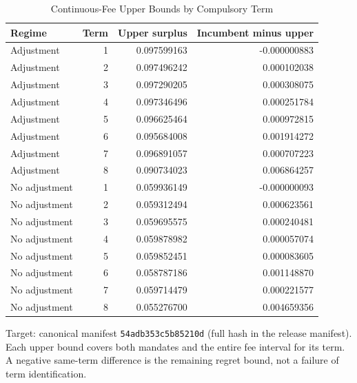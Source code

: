 \begin{table}[t]
\caption{Continuous-Fee Upper Bounds by Compulsory Term}\label{tab:termbounds}
\centering
\footnotesize
\begin{tabular}{@{}lrrr@{}}
\toprule
Regime & Term & Upper surplus & Incumbent minus upper \\
\midrule
Adjustment & 1 & 0.097599163 & -0.000000883 \\
Adjustment & 2 & 0.097496242 & 0.000102038 \\
Adjustment & 3 & 0.097290205 & 0.000308075 \\
Adjustment & 4 & 0.097346496 & 0.000251784 \\
Adjustment & 5 & 0.096625464 & 0.000972815 \\
Adjustment & 6 & 0.095684008 & 0.001914272 \\
Adjustment & 7 & 0.096891057 & 0.000707223 \\
Adjustment & 8 & 0.090734023 & 0.006864257 \\
No adjustment & 1 & 0.059936149 & -0.000000093 \\
No adjustment & 2 & 0.059312494 & 0.000623561 \\
No adjustment & 3 & 0.059695575 & 0.000240481 \\
No adjustment & 4 & 0.059878982 & 0.000057074 \\
No adjustment & 5 & 0.059852451 & 0.000083605 \\
No adjustment & 6 & 0.058787186 & 0.001148870 \\
No adjustment & 7 & 0.059714479 & 0.000221577 \\
No adjustment & 8 & 0.055276700 & 0.004659356 \\
\bottomrule
\end{tabular}
\par\smallskip\begin{minipage}{\linewidth}\footnotesize Target: canonical manifest \texttt{54adb353c5b85210d} (full hash in the release manifest). Each upper bound covers both mandates and the entire fee interval for its term. A negative same-term difference is the remaining regret bound, not a failure of term identification.\end{minipage}
\end{table}
